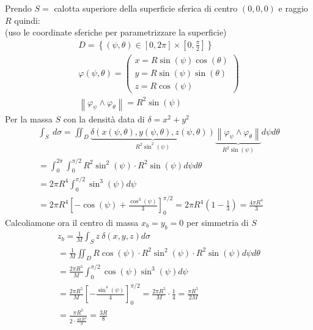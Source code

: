 \documentclass[a4paper, oneside]{article}
\begin{document}
\begin{example}
  Prendo $S =$ calotta superiore della superficie sferica di centro $(0,0,0)$ e raggio $R$ quindi:\\
  (uso le coordinate sferiche per parametrizzare la superficie)
  \begin{gather*}
    D = \left\{ (\psi, \theta) \in [0,2\pi] \times [0, \frac{\pi}{2}]\right\} \\
    \varphi(\psi, \theta) = \begin{pmatrix}
        x =R \sin(\psi) \cos(\theta)\\
        y =R \sin(\psi) \sin(\theta)\\
        z =R \cos(\psi)
    \end{pmatrix}\\
    \left\lVert \varphi_\psi \land \varphi_\theta \right\rVert = R^2 \sin(\psi)
  \end{gather*}
  Per la massa $S$ con la densità data di $\delta = x^2+y^2$
  \begin{gather*}
    \int_S \ d \sigma = \iint_D \underbrace{\delta(x(\psi, \theta), y(\psi, \theta), z(\psi, \theta))}_{R^2 \sin^2(\psi)} \underbrace{\left\lVert \varphi_\psi \land \varphi_\theta \right\rVert}_{R^2 \sin(\psi)} d\psi d\theta\\
    = \int_0^{2\pi} \int_0^{\pi/2} R^2 \sin^2(\psi) \cdot R^2 \sin(\psi) d\psi d\theta\\
    = 2\pi R^4 \int_0^{\pi/2} \sin^3(\psi) d\psi\\
    = 2\pi R^4 \left[ -\cos(\psi) + \frac{\cos^3(\psi)}{3} \right]_0^{\pi/2} = 2\pi R^4 \left( 1 - \frac{1}{3} \right) = \frac{4\pi R^4}{3}
  \end{gather*}
  Calcoliamone ora il centro di massa $x_b=y_b=0$ per simmetria di $S$
  \begin{gather*}
    z_b = \frac{1}{M} \int_S z \ \delta(x,y,z) d \sigma\\
    = \frac{1}{M} \iint_D R \cos(\psi) \cdot R^2 \sin^2(\psi) \cdot R^2 \sin(\psi) d\psi d\theta\\
    = \frac{2\pi R^5}{M} \int_0^{\pi/2} \cos(\psi) \sin^3(\psi) d\psi\\
    = \frac{2\pi R^5}{M} \left[ -\frac{\sin^4(\psi)}{4} \right]_0^{\pi/2} = \frac{2\pi R^5}{M} \cdot \frac{1}{4} = \frac{\pi R^5}{2M}\\
    = \frac{\pi R^5}{2 \cdot \frac{4\pi R^4}{3}} = \frac{3R}{8}
  \end{gather*}
\end{example}
\end{document}
